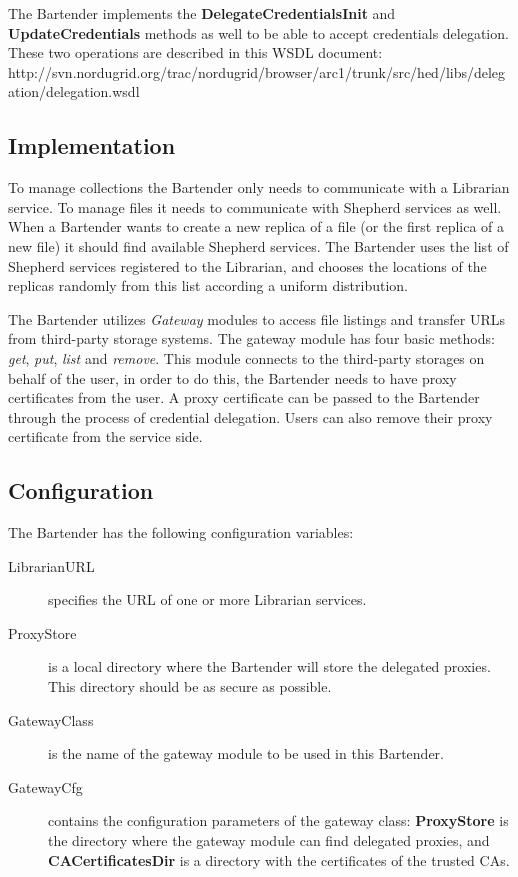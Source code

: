 \documentclass{book}
\begin{document}
The Bartender implements the \textbf{DelegateCredentialsInit} and \textbf{UpdateCredentials} methods as well to be able to accept credentials delegation. These two operations are described in this WSDL document: http://svn.nordugrid.org/trac/nordugrid/browser/arc1/trunk/src/hed/libs/delegation/delegation.wsdl



\subsection{Implementation} %

To manage collections the Bartender only needs to communicate with a Librarian service. To manage files it needs to communicate with Shepherd services as well. When a Bartender wants to create a new replica of a file (or the first replica of a new file) it should find available Shepherd services. The Bartender uses the list of Shepherd services registered to the Librarian, and chooses the locations of the replicas randomly from this list according a uniform distribution. 

The Bartender utilizes \emph{Gateway} modules to access file listings and transfer URLs from third-party storage systems. The gateway module has four basic methods: \emph{get}, \emph{put}, \emph{list} and \emph{remove}. This module connects to the third-party storages on behalf of the user, in order to do this, the Bartender needs to have proxy certificates from the user. A proxy certificate can be passed to the Bartender through the process of credential delegation. Users can also remove their proxy certificate from the service side. 

\subsection{Configuration} %

The Bartender has the following configuration variables:

\begin{description}
    \item[LibrarianURL] specifies the URL of one or more Librarian services.
    \item[ProxyStore] is a local directory where the Bartender will store the delegated proxies. This directory should be as secure as possible.
    \item[GatewayClass] is the name of the gateway module to be used in this Bartender.
    \item[GatewayCfg] contains the configuration parameters of the gateway class: \textbf{ProxyStore} is the directory where the gateway module can find delegated proxies, and \textbf{CACertificatesDir} is a directory with the certificates of the trusted CAs. 
\end{description}
\end{document}
